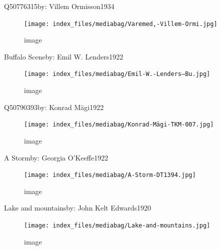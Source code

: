 \documentclass[
  a4paper,
]{book}
\begin{document}
\label{http:ux2fux2fwww.wikidata.orgux2fentityux2fQ50776315}
Q50776315by: Villem Ormisson1934

\begin{figure}[H]

{\centering \texttt{[image: index\_files/mediabag/Varemed,-Villem-Ormi.jpg]}

}

\caption{image}

\end{figure}%

\label{http:ux2fux2fwww.wikidata.orgux2fentityux2fQ20491060}
Buffalo Sceneby: Emil W. Lenders1922

\begin{figure}[H]

{\centering \texttt{[image: index\_files/mediabag/Emil-W.-Lenders---Bu.jpg]}

}

\caption{image}

\end{figure}%

\label{http:ux2fux2fwww.wikidata.orgux2fentityux2fQ50790393}
Q50790393by: Konrad Mägi1922

\begin{figure}[H]

{\centering \texttt{[image: index\_files/mediabag/Konrad-Mägi-TKM-007.jpg]}

}

\caption{image}

\end{figure}%

\label{http:ux2fux2fwww.wikidata.orgux2fentityux2fQ20191641}
A Stormby: Georgia O'Keeffe1922

\begin{figure}[H]

{\centering \texttt{[image: index\_files/mediabag/A-Storm-DT1394.jpg]}

}

\caption{image}

\end{figure}%

\label{http:ux2fux2fwww.wikidata.orgux2fentityux2fQ64686030}
Lake and mountainsby: John Kelt Edwards1920

\begin{figure}[H]

{\centering \texttt{[image: index\_files/mediabag/Lake-and-mountains.jpg]}

}

\caption{image}

\end{figure}%
\end{document}
